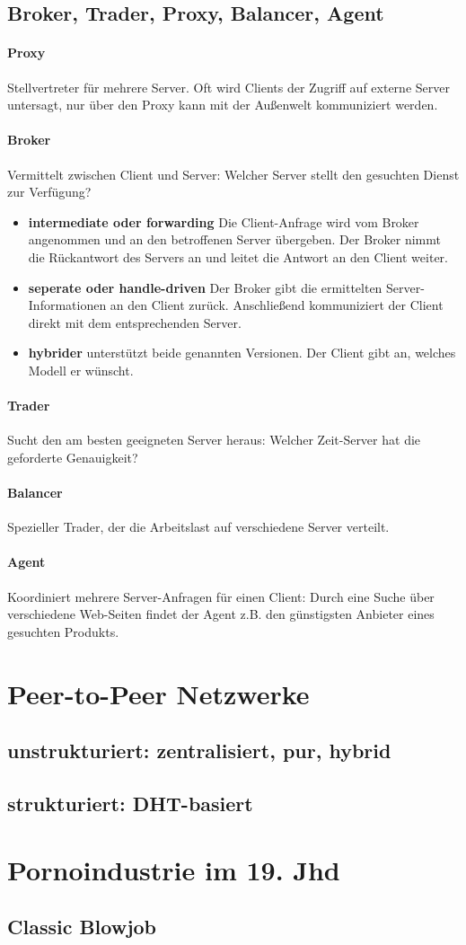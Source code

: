 \documentclass[a4paper]{article}
\begin{document}
	\subsection{Broker, Trader, Proxy, Balancer, Agent}
		\paragraph{Proxy}Stellvertreter für mehrere Server. Oft wird Clients der Zugriff auf externe Server untersagt, nur über den Proxy kann mit der Außenwelt kommuniziert werden.
		\paragraph{Broker} Vermittelt zwischen Client und Server: Welcher Server stellt den gesuchten Dienst zur Verfügung?
			\begin{itemize}
				\item \textbf{intermediate oder forwarding} Die Client-Anfrage wird vom Broker angenommen und an den betroffenen Server übergeben. Der Broker nimmt die Rückantwort des Servers an und leitet die Antwort an den Client weiter.
				\item \textbf{seperate oder handle-driven} Der Broker gibt die ermittelten Server-Informationen an den Client zurück. Anschließend kommuniziert der Client direkt mit dem entsprechenden Server.
				\item \textbf{hybrider} unterstützt beide genannten Versionen. Der Client gibt an, welches Modell er wünscht.
			\end{itemize}
		\paragraph{Trader} Sucht den am besten geeigneten Server heraus: Welcher Zeit-Server hat die geforderte Genauigkeit?
		\paragraph{Balancer}Spezieller Trader, der die Arbeitslast auf verschiedene Server verteilt.
		\paragraph{Agent}Koordiniert mehrere Server-Anfragen für einen Client: Durch eine Suche über verschiedene Web-Seiten findet der Agent z.B. den günstigsten Anbieter eines gesuchten Produkts.
\pagebreak
\section{Peer-to-Peer Netzwerke}
	\subsection{unstrukturiert: zentralisiert, pur, hybrid}
	\subsection{strukturiert: DHT-basiert}
	
\section{Pornoindustrie im 19. Jhd}
	\subsection{Classic Blowjob}
	
\end{document}
